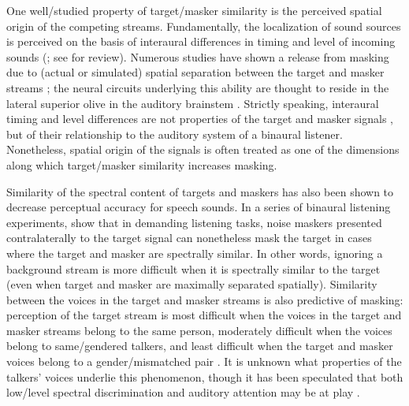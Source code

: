 One well\-/studied property of target\-/masker similarity is the perceived spatial origin of the competing streams.  Fundamentally, the localization of sound sources is perceived on the basis of interaural differences in timing and level of incoming sounds (\citealp[\eg,][]{Hirsh1950, Kock1950}; see \citealp{Darwin2008} for review).  Numerous studies have shown a release from masking due to (actual or simulated) spatial separation between the target and masker streams \citep[\eg,][]{CarhartEtAl1968, FreymanEtAl1999, BrungartSimpson2002, FreymanEtAl2004, GallunEtAl2005, KiddEtAl2005a, JohnstoneLitovsky2006}; the neural circuits underlying this ability are thought to reside in the lateral superior olive in the auditory brainstem \citep{ParkEtAl2004, TollinYin2005}.  Strictly speaking, interaural timing and level differences are not properties of the target and masker signals \perse, but of their relationship to the auditory system of a binaural listener.  Nonetheless, spatial origin of the signals is often treated as one of the dimensions along which target\-/masker similarity increases masking.   %

Similarity of the spectral content of targets and maskers has also been shown to decrease perceptual accuracy for speech sounds.  In a series of binaural listening experiments, \citet{GallunEtAl2007} show that in demanding listening tasks, noise maskers presented contralaterally to the target signal can nonetheless mask the target in cases where the target and masker are spectrally similar.  In other words, ignoring a background stream is more difficult when it is spectrally similar to the target (even when target and masker are maximally separated spatially).  Similarity between the voices in the target and masker streams is also predictive of masking: perception of the target stream is most difficult when the voices in the target and masker streams belong to the same person, moderately difficult when the voices belong to same\-/gendered talkers, and least difficult when the target and masker voices belong to a gender\-/mismatched pair \citep{Brungart2001}.  It is unknown what properties of the talkers’ voices underlie this phenomenon, though it has been speculated that both low\-/level spectral discrimination and auditory attention may be at play \citep{HelferFreyman2008}.

